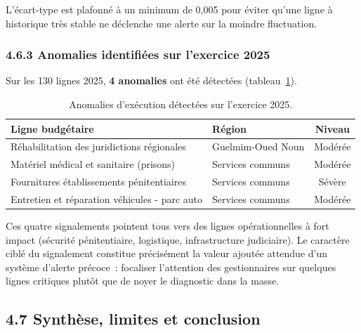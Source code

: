 \noindent
L'\'ecart-type est plafonn\'e \`a un minimum de 0{,}005 pour \'eviter qu'une ligne
\`a historique tr\`es stable ne d\'eclenche une alerte sur la moindre fluctuation.

\subsubsection*{4.6.3 \quad Anomalies identifi\'ees sur l'exercice 2025}

Sur les 130 lignes 2025, \textbf{4 anomalies} ont \'et\'e d\'etect\'ees
(tableau~\ref{tab:anomalies}).

\begin{table}[H]
\centering\small
\caption{Anomalies d'ex\'ecution d\'etect\'ees sur l'exercice 2025.}
\label{tab:anomalies}
\begin{tabular}{@{}p{6cm}p{4cm}c@{}}
\toprule
\textbf{Ligne budg\'etaire} & \textbf{R\'egion} & \textbf{Niveau} \\
\midrule
R\'ehabilitation des juridictions r\'egionales       & Guelmim-Oued Noun  & Mod\'er\'ee \\
Mat\'eriel m\'edical et sanitaire (prisons)          & Services communs   & Mod\'er\'ee \\
Fournitures \'etablissements p\'enitentiaires        & Services communs   & S\'ev\`ere   \\
Entretien et r\'eparation v\'ehicules - parc auto    & Services communs   & Mod\'er\'ee \\
\bottomrule
\end{tabular}
\end{table}

\noindent
Ces quatre signalements pointent tous vers des lignes op\'erationnelles \`a fort
impact (s\'ecurit\'e p\'enitentiaire, logistique, infrastructure judiciaire).
Le caract\`ere cibl\'e du signalement constitue pr\'ecis\'ement la valeur ajout\'ee
attendue d'un syst\`eme d'alerte pr\'ecoce~: focaliser l'attention des gestionnaires
sur quelques lignes critiques plut\^ot que de noyer le diagnostic dans la masse.

\subsection*{4.7 \quad Synth\`ese, limites et conclusion}


